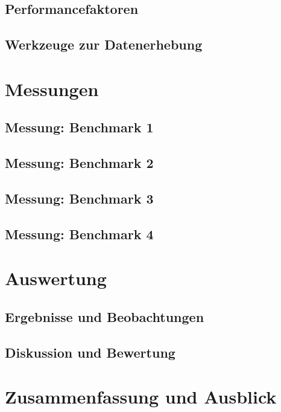 \documentclass[fontsize=12pt,paper=a4,twoside=semi,parskip=half-,headsepline,headinclude]{scrreprt}
\begin{document}
\section{Performancefaktoren}

\section{Werkzeuge zur Datenerhebung}



\chapter{Messungen}

\section{Messung: Benchmark 1}

\section{Messung: Benchmark 2}

\section{Messung: Benchmark 3}

\section{Messung: Benchmark 4}



\chapter{Auswertung}

\section{Ergebnisse und Beobachtungen}

\section{Diskussion und Bewertung}



\chapter{Zusammenfassung und Ausblick}
\end{document}
